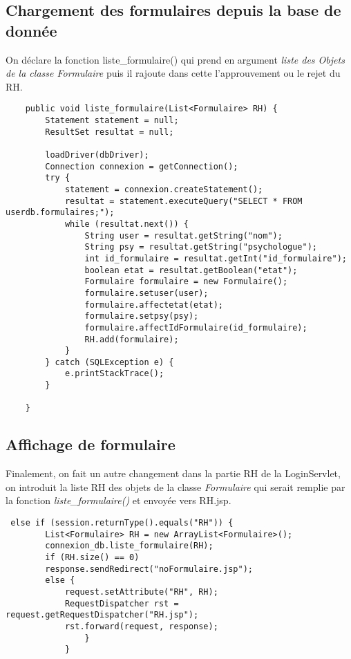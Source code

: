 \documentclass[12]{article}
\begin{document}
\subsection{Chargement des formulaires depuis la base de donnée}

On déclare la fonction liste\_formulaire() qui prend en argument  \textit{liste des Objets de la classe Formulaire} puis il rajoute dans cette l'approuvement ou le rejet du RH.

\begin{scriptsize}
\lstset{language=java}
\begin{lstlisting}
	public void liste_formulaire(List<Formulaire> RH) {
		Statement statement = null;
		ResultSet resultat = null;

		loadDriver(dbDriver);
		Connection connexion = getConnection();
		try {
			statement = connexion.createStatement();
			resultat = statement.executeQuery("SELECT * FROM userdb.formulaires;");
			while (resultat.next()) {
				String user = resultat.getString("nom");
				String psy = resultat.getString("psychologue");
				int id_formulaire = resultat.getInt("id_formulaire");
				boolean etat = resultat.getBoolean("etat");
				Formulaire formulaire = new Formulaire();
				formulaire.setuser(user);
				formulaire.affectetat(etat);
				formulaire.setpsy(psy);
				formulaire.affectIdFormulaire(id_formulaire);
				RH.add(formulaire);
			}
		} catch (SQLException e) {
			e.printStackTrace();
		}

	}

\end{lstlisting}
\end{scriptsize}

\subsection{Affichage de formulaire}

Finalement, on fait un autre changement dans la partie RH de la LoginServlet, on introduit la liste RH des objets de la classe \textit{Formulaire} qui serait remplie par la fonction \textit{liste\_formulaire()} et envoyée vers RH.jsp.
\begin{scriptsize}

\lstset{language=java}
\begin{lstlisting}
 else if (session.returnType().equals("RH")) {
		List<Formulaire> RH = new ArrayList<Formulaire>();
		connexion_db.liste_formulaire(RH);
		if (RH.size() == 0)
		response.sendRedirect("noFormulaire.jsp");
	    else {
			request.setAttribute("RH", RH);
			RequestDispatcher rst = request.getRequestDispatcher("RH.jsp");
			rst.forward(request, response);
				}
			}
\end{lstlisting}
\end{scriptsize}
\end{document}
